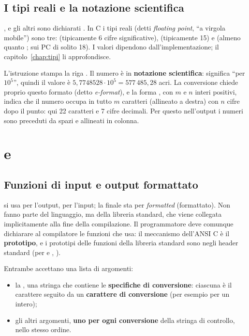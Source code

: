 \subsection{I tipi reali e la notazione scientifica}

,  e gli altri sono dichiarati . In
C i tipi reali (detti \textit{floating point}, “a virgola mobile”) sono
tre:  (tipicamente 6 cifre significative), 
(tipicamente 15) e  (almeno quanto ; sui PC
di solito 18). I valori dipendono dall'implementazione; il
capitolo~\ref{chap:tipi} li approfondisce.

L'istruzione  stampa la
riga . Il numero è in \textbf{notazione
scientifica}:  significa “per $10^5$”, quindi il valore è
$5{,}7748528 \cdot 10^5 = 577\,485{,}28$ acri. La conversione 
chiede proprio questo formato (detto \textit{e-format}), e la forma
, con $m$ e $n$ interi positivi, indica che il numero
occupa in tutto $m$ caratteri (allineato a destra) con $n$ cifre dopo il
punto: qui 22 caratteri e 7 cifre decimali. Per questo nell'output i numeri
sono preceduti da spazi e allineati in colonna.

\section{ e }

\subsection{Funzioni di input e output formattato}

 si usa per l'output,  per l'input; la 
finale sta per \textit{formatted} (formattato). Non fanno parte del
linguaggio, ma della libreria standard, che viene collegata implicitamente
alla fine della compilazione. Il programmatore deve comunque dichiarare al
compilatore le funzioni che usa: il meccanismo dell'ANSI C è il
\textbf{prototipo}, e i prototipi delle funzioni della libreria standard
sono negli header standard (per  e ,
).

Entrambe accettano una lista di argomenti:

\begin{itemize}
  \item la , una stringa che contiene le
        \textbf{specifiche di conversione}: ciascuna è il carattere \code{\%}
        seguito da un \textbf{carattere di conversione} (per esempio
         per un intero);
  \item gli altri argomenti, \textbf{uno per ogni conversione} della stringa
        di controllo, nello stesso ordine.
\end{itemize}

